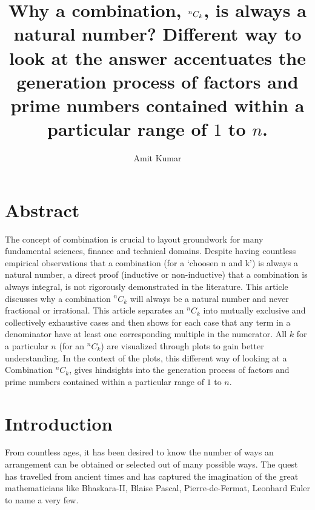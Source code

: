 \documentclass[10pt, twoside]{article}
\title{Why a combination, $\Combination{n}{k}$, is always a natural number? Different way to look at the answer accentuates the generation process of factors and prime numbers contained within a particular range of $1$ to $n$.}
\author{Amit Kumar}
\date{}
\newcommand*{\Combination}[2]{{}^{#1}C_{#2}}%
\begin{document}
	\maketitle
	\section{Abstract}
	 The concept of combination is crucial to layout groundwork for many fundamental sciences, finance and technical domains. Despite having countless empirical observations that a combination (for a `choosen n and k') is always a natural number, a direct proof (inductive or non-inductive) that a combination is always integral, is not rigorously demonstrated in the literature. This article discusses why a combination $\Combination{n}{k}$ will always be a natural number and never fractional or irrational. This article separates an $\Combination{n}{k}$ into mutually exclusive and collectively exhaustive cases and then shows for each case that any term in a denominator have at least one corresponding multiple in the numerator. All $k$ for a particular $n$ (for an $\Combination{n}{k}$) are visualized through plots to gain better understanding. In the context of the plots, this different way of looking at a Combination $\Combination{n}{k}$, gives hindsights into the generation process of factors and prime numbers contained within a particular range of $1$ to $n$.
	\section{Introduction}
	From countless ages, it has been desired to know the number of ways an arrangement can be obtained or selected out of many possible ways. The quest has travelled from ancient times and has captured the imagination of the great mathematicians like Bhaskara-II\cite{wikipediaCombinatorics}, Blaise Pascal\cite{wikipediaPascal}, Pierre-de-Fermat\cite{wikipediaFermat}, Leonhard Euler\cite{wikipediaEuler} to name a very few.
	
\end{document}
